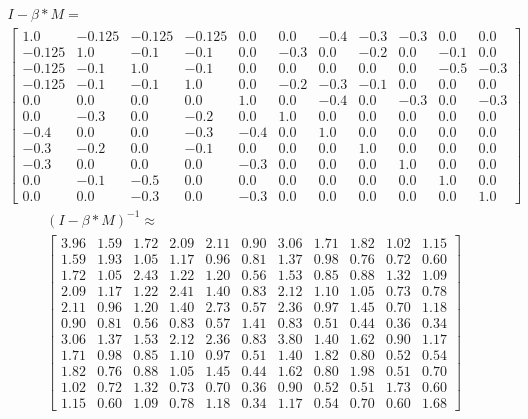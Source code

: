 \begin{gather}
	\nonumber I - \beta * M = \\
	\begin{bmatrix}
		1.0 & -0.125 & -0.125 & -0.125 & 0.0 & 0.0 & -0.4 & -0.3 & -0.3 & 0.0 & 0.0\\
		-0.125 & 1.0 & -0.1 & -0.1 & 0.0 & -0.3 & 0.0 & -0.2 & 0.0 & -0.1 & 0.0\\
		-0.125 & -0.1 & 1.0 & -0.1 & 0.0 & 0.0 & 0.0 & 0.0 & 0.0 & -0.5 & -0.3\\
		-0.125 & -0.1 & -0.1 & 1.0 & 0.0 & -0.2 & -0.3 & -0.1 & 0.0 & 0.0 & 0.0\\
		0.0 & 0.0 & 0.0 & 0.0 & 1.0 & 0.0 & -0.4 & 0.0 & -0.3 & 0.0 & -0.3\\
		0.0 & -0.3 & 0.0 & -0.2 & 0.0 & 1.0 & 0.0 & 0.0 & 0.0 & 0.0 & 0.0\\
		-0.4 & 0.0 & 0.0 & -0.3 & -0.4 & 0.0 & 1.0 & 0.0 & 0.0 & 0.0 & 0.0\\
		-0.3 & -0.2 & 0.0 & -0.1 & 0.0 & 0.0 & 0.0 & 1.0 & 0.0 & 0.0 & 0.0\\
		-0.3 & 0.0 & 0.0 & 0.0 & -0.3 & 0.0 & 0.0 & 0.0 & 1.0 & 0.0 & 0.0\\
		0.0 & -0.1 & -0.5 & 0.0 & 0.0 & 0.0 & 0.0 & 0.0 & 0.0 & 1.0 & 0.0\\
		0.0 & 0.0 & -0.3 & 0.0 & -0.3 & 0.0 & 0.0 & 0.0 & 0.0 & 0.0 & 1.0
	\end{bmatrix}
	\label{frml:katzZentralitaetPseudoMitarbeiter:formel3}
\end{gather}
\begin{gather}
	\nonumber (I - \beta * M)^{-1} \approx\\
	\begin{bmatrix}
		3.96 & 1.59 & 1.72 & 2.09 & 2.11 & 0.90 & 3.06 & 1.71 & 1.82 & 1.02 & 1.15\\
		1.59 & 1.93 & 1.05 & 1.17 & 0.96 & 0.81 & 1.37 & 0.98 & 0.76 & 0.72 & 0.60\\
		1.72 & 1.05 & 2.43 & 1.22 & 1.20 & 0.56 & 1.53 & 0.85 & 0.88 & 1.32 & 1.09\\
		2.09 & 1.17 & 1.22 & 2.41 & 1.40 & 0.83 & 2.12 & 1.10 & 1.05 & 0.73 & 0.78\\
		2.11 & 0.96 & 1.20 & 1.40 & 2.73 & 0.57 & 2.36 & 0.97 & 1.45 & 0.70 & 1.18\\
		0.90 & 0.81 & 0.56 & 0.83 & 0.57 & 1.41 & 0.83 & 0.51 & 0.44 & 0.36 & 0.34\\
		3.06 & 1.37 & 1.53 & 2.12 & 2.36 & 0.83 & 3.80 & 1.40 & 1.62 & 0.90 & 1.17\\
		1.71 & 0.98 & 0.85 & 1.10 & 0.97 & 0.51 & 1.40 & 1.82 & 0.80 & 0.52 & 0.54\\
		1.82 & 0.76 & 0.88 & 1.05 & 1.45 & 0.44 & 1.62 & 0.80 & 1.98 & 0.51 & 0.70\\
		1.02 & 0.72 & 1.32 & 0.73 & 0.70 & 0.36 & 0.90 & 0.52 & 0.51 & 1.73 & 0.60\\
		1.15 & 0.60 & 1.09 & 0.78 & 1.18 & 0.34 & 1.17 & 0.54 & 0.70 & 0.60 & 1.68
	\end{bmatrix}
	\label{frml:katzZentralitaetPseudoMitarbeiter:formel4}
\end{gather}
